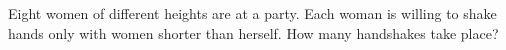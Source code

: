 Eight women of different heights are at a party. Each woman is willing to shake hands only with women shorter than herself. How many handshakes take place?
